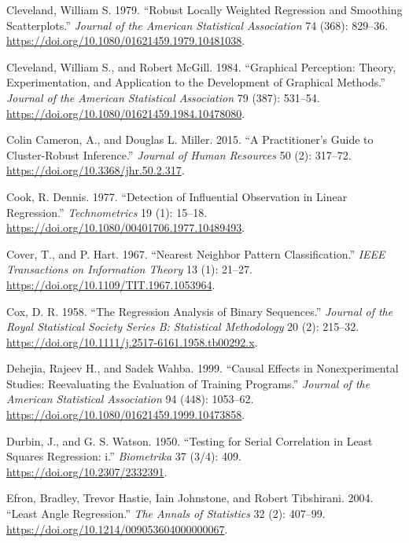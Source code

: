 \documentclass[
  letterpaper,
  10pt,
  twoside,
  openright,
  numbers=noenddot,
  chapterprefix=true]{scrbook}
\newlength{\cslhangindent}
\newenvironment{CSLReferences}[2] %
 {\begin{list}{}{%
  \setlength{\itemindent}{0pt}
  \setlength{\leftmargin}{0pt}
  \setlength{\parsep}{0pt}
  \ifodd #1
   \setlength{\leftmargin}{\cslhangindent}
   \setlength{\itemindent}{-1\cslhangindent}
  \fi
  \setlength{\itemsep}{#2\baselineskip}}}
 {\end{list}}
\begin{document}
\begin{CSLReferences}{1}{0}
Cleveland, William S. 1979. {``{Robust} {Locally} {Weighted}
{Regression} and {Smoothing} {Scatterplots}.''} \emph{{Journal} of the
{American} {Statistical} {Association}} 74 (368): 829--36.
\url{https://doi.org/10.1080/01621459.1979.10481038}.

Cleveland, William S., and Robert McGill. 1984. {``{Graphical}
{Perception}: {Theory}, {Experimentation}, and {Application} to the
{Development} of {Graphical} {Methods}.''} \emph{{Journal} of the
{American} {Statistical} {Association}} 79 (387): 531--54.
\url{https://doi.org/10.1080/01621459.1984.10478080}.

Colin Cameron, A., and Douglas L. Miller. 2015. {``A {Practitioner}'s
{Guide} to {Cluster}-{Robust} {Inference}.''} \emph{{Journal} of {Human}
{Resources}} 50 (2): 317--72.
\url{https://doi.org/10.3368/jhr.50.2.317}.

Cook, R. Dennis. 1977. {``{Detection} of {Influential} {Observation} in
{Linear} {Regression}.''} \emph{{Technometrics}} 19 (1): 15--18.
\url{https://doi.org/10.1080/00401706.1977.10489493}.

Cover, T., and P. Hart. 1967. {``{Nearest} Neighbor Pattern
Classification.''} \emph{{IEEE} {Transactions} on {Information}
{Theory}} 13 (1): 21--27.
\url{https://doi.org/10.1109/TIT.1967.1053964}.

Cox, D. R. 1958. {``{The} {Regression} {Analysis} of {Binary}
{Sequences}.''} \emph{{Journal} of the {Royal} {Statistical} {Society}
{Series} B: {Statistical} {Methodology}} 20 (2): 215--32.
\url{https://doi.org/10.1111/j.2517-6161.1958.tb00292.x}.

Dehejia, Rajeev H., and Sadek Wahba. 1999. {``{Causal} {Effects} in
{Nonexperimental} {Studies}: {Reevaluating} the {Evaluation} of
{Training} {Programs}.''} \emph{{Journal} of the {American}
{Statistical} {Association}} 94 (448): 1053--62.
\url{https://doi.org/10.1080/01621459.1999.10473858}.

Durbin, J., and G. S. Watson. 1950. {``{Testing} for {Serial}
{Correlation} in {Least} {Squares} {Regression}: i.''}
\emph{{Biometrika}} 37 (3/4): 409.
\url{https://doi.org/10.2307/2332391}.

Efron, Bradley, Trevor Hastie, Iain Johnstone, and Robert Tibshirani.
2004. {``{Least} Angle Regression.''} \emph{{The} {Annals} of
{Statistics}} 32 (2): 407--99.
\url{https://doi.org/10.1214/009053604000000067}.


\end{CSLReferences}
\end{document}
